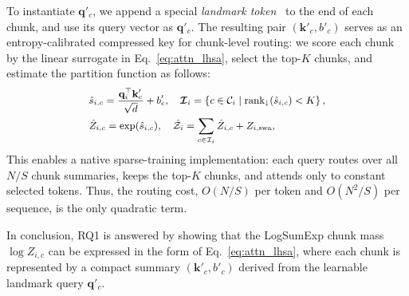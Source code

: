 To instantiate $\mathbf{q}'_c$, we append a special \textit{landmark token}~\cite{mohtashami2023random} to the end of each chunk, and use its query vector as $\mathbf{q}'_c$. The resulting pair $(\mathbf{k}'_c,b'_c)$ serves as an entropy-calibrated compressed key for chunk-level routing: we score each chunk by the linear surrogate in Eq.~\eqref{eq:attn_lhsa}, select the top-$K$ chunks, and estimate the partition function as follows:
\begin{equation}
\label{eq:surrogate_topk}
\small
\begin{aligned}
    &\hat{s}_{i,c} = \frac{\mathbf{q}_i^\top \mathbf{k}'_c}{\sqrt{d}} + b'_{c}, \quad \bm{\mathcal{I}}_i=\left\{
    c \in \mathcal{C}_i
    \mid
    \operatorname{rank}_{\downarrow}(\hat{s}_{i,c}) < K
    \right\},\\
    &\hat{Z}_{i,c} = \exp(\hat{s}_{i,c}), \quad \hat{\mathcal{Z}}_i = \sum_{c \in {\mathcal{I}}_i} \hat{Z}_{i,c} + Z_{i,\text{swa}}, \\
\end{aligned}
\end{equation}
This enables a native sparse-training implementation: each query routes over all $N/S$ chunk summaries, keeps the top-$K$ chunks, and attends only to constant selected tokens. Thus, the routing cost, $O(N/S)$ per token and $O(N^2/S)$ per sequence, is the only quadratic term.

In conclusion, RQ1 is answered by showing that the LogSumExp chunk mass $\log Z_{i,c}$ can be expressed in the form of Eq.~\eqref{eq:attn_lhsa}, where each chunk is represented by a compact summary $(\mathbf{k}'_c,b'_c)$ derived from the learnable landmark query $\mathbf{q}'_c$.


